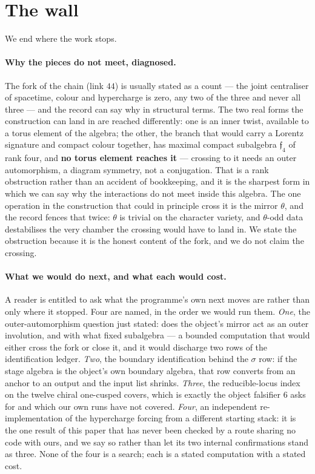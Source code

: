 \documentclass[11pt,a4paper]{article}
\theoremstyle{definition}
\theoremstyle{remark}
\begin{document}
\section{The wall}\label{sec:wall}

We end where the work stops.

\paragraph{Why the pieces do not meet, diagnosed.} The fork of the chain (link $44$) is usually stated as a
count --- the joint centraliser of spacetime, colour and hypercharge is zero, any two of the three and never all
three --- and the record can say why in structural terms. The two real forms the construction can land in are
reached differently: one is an inner twist, available to a torus element of the algebra; the other, the branch that
would carry a Lorentz signature and compact colour together, has maximal compact subalgebra $\mathfrak{f}_4$ of rank
four, and \textbf{no torus element reaches it} --- crossing to it needs an outer automorphism, a diagram symmetry,
not a conjugation. That is a rank obstruction rather than an accident of bookkeeping, and it is the sharpest form in
which we can say why the interactions do not meet inside this algebra. The one operation in the construction that
could in principle cross it is the mirror $\theta$, and the record fences that twice: $\theta$ is trivial on the
character variety, and $\theta$-odd data destabilises the very chamber the crossing would have to land in. We state
the obstruction because it is the honest content of the fork, and we do not claim the crossing.

\paragraph{What we would do next, and what each would cost.} A reader is entitled to ask what the programme's
own next moves are rather than only where it stopped. Four are named, in the order we would run them. \emph{One},
the outer-automorphism question just stated: does the object's mirror act as an outer involution, and with what
fixed subalgebra --- a bounded computation that would either cross the fork or close it, and it would discharge two
rows of the identification ledger. \emph{Two}, the boundary identification behind the $\sigma$ row: if the stage
algebra is the object's own boundary algebra, that row converts from an anchor to an output and the input list
shrinks. \emph{Three}, the reducible-locus index on the twelve chiral one-cusped covers, which is exactly the
object falsifier $6$ asks for and which our own runs have not covered. \emph{Four}, an independent
re-implementation of the hypercharge forcing from a different starting stack: it is the one result of this paper
that has never been checked by a route sharing no code with ours, and we say so rather than let its two internal
confirmations stand as three. None of the four is a search; each is a stated computation with a stated cost.
\end{document}
